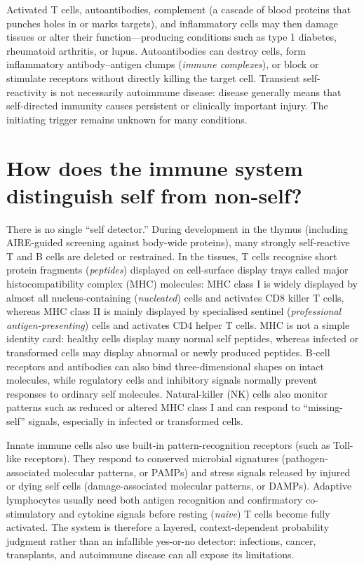 \documentclass[11pt,oneside]{report}
\begin{document}
Activated T cells, autoantibodies, complement (a cascade of blood proteins that
punches holes in or marks targets), and inflammatory cells may then damage
tissues or alter their function—producing conditions such as type 1 diabetes,
rheumatoid arthritis, or lupus. Autoantibodies can destroy cells, form
inflammatory antibody--antigen clumps (\emph{immune complexes}), or block or
stimulate receptors without directly killing the target cell. Transient self-reactivity is not
necessarily autoimmune disease: disease generally means that self-directed
immunity causes persistent or clinically important injury. The initiating
trigger remains unknown for many conditions.

\section{How does the immune system distinguish self from non-self?}

There is no single ``self detector.'' During development in the thymus (including AIRE-guided screening against
body-wide proteins), many strongly self-reactive T and B cells are deleted or
restrained. In the tissues, T cells recognise short protein fragments
(\emph{peptides}) displayed on cell-surface display trays called major
histocompatibility complex (MHC) molecules: MHC class I is widely displayed by
almost all nucleus-containing (\emph{nucleated}) cells and activates CD8 killer
T cells, whereas MHC class II is mainly displayed by specialised sentinel
(\emph{professional antigen-presenting}) cells and activates CD4 helper T cells.
MHC is not a simple identity card:
healthy cells display many normal self peptides, whereas infected or transformed
cells may display abnormal or newly produced peptides. B-cell receptors and
antibodies can also bind three-dimensional shapes on intact molecules, while
regulatory cells and inhibitory signals normally prevent responses to ordinary
self molecules. Natural-killer (NK) cells also monitor patterns such as reduced
or altered MHC class I and can respond to ``missing-self'' signals, especially in
infected or transformed cells.

Innate immune cells also use built-in pattern-recognition receptors (such as
Toll-like receptors). They respond to conserved microbial signatures
(pathogen-associated molecular patterns, or PAMPs) and stress signals released
by injured or dying self cells (damage-associated molecular patterns, or DAMPs).
Adaptive lymphocytes usually need both antigen recognition and confirmatory
co-stimulatory and cytokine signals before resting (\emph{naive}) T cells become
fully activated. The system is therefore a layered, context-dependent probability
judgment rather than an infallible yes-or-no detector: infections, cancer,
transplants, and autoimmune disease can all expose its limitations.
\end{document}
